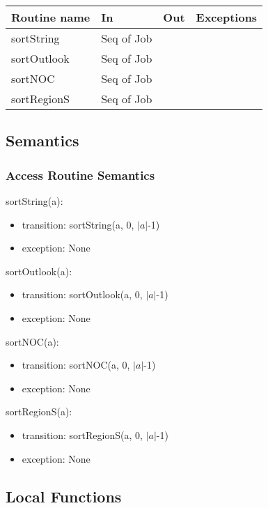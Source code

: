 \documentclass[12pt]{article}
\begin{document}
\begin{tabular}{| l | l | l | p{6cm} |}
\hline
\textbf{Routine name} & \textbf{In} & \textbf{Out} & \textbf{Exceptions}\\
\hline
sortString & Seq of Job & ~ & \\
\hline
sortOutlook & Seq of Job & ~ & \\
\hline
sortNOC & Seq of Job & ~ & \\
\hline
sortRegionS & Seq of Job & ~ & \\
\hline
\end{tabular}

\subsection* {Semantics}

\subsubsection* {Access Routine Semantics}

\noindent sortString(a):
\begin{itemize}
\item transition: sortString(a, 0, $|a|$-1)
\item exception: None
\end{itemize}

\noindent sortOutlook(a):
\begin{itemize}
\item transition: sortOutlook(a, 0, $|a|$-1)
\item exception: None
\end{itemize}

\noindent sortNOC(a):
\begin{itemize}
\item transition: sortNOC(a, 0, $|a|$-1)
\item exception: None
\end{itemize}

\noindent sortRegionS(a):
\begin{itemize}
\item transition: sortRegionS(a, 0, $|a|$-1)
\item exception: None
\end{itemize}

\subsection*{Local Functions}
\end{document}

